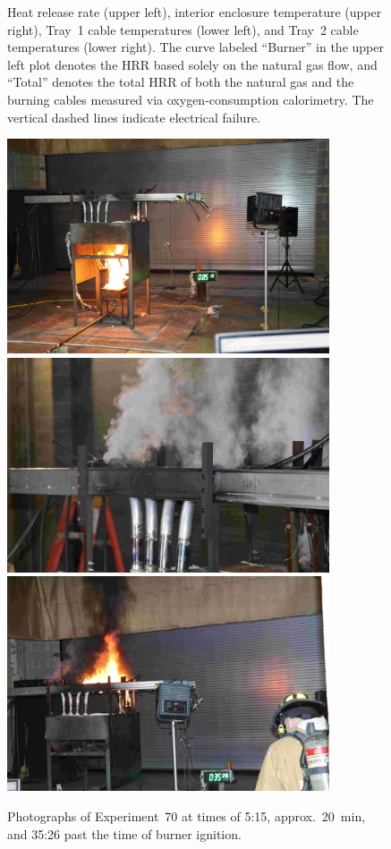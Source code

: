 \begin{figure}[H]
\caption[HRR and temperatures of Experiment 70]{Heat release rate (upper left), interior enclosure temperature (upper right), Tray~1 cable temperatures (lower left), and Tray~2 cable temperatures (lower right). The curve labeled ``Burner'' in the upper left plot denotes the HRR based solely on the natural gas flow, and ``Total'' denotes the total HRR of both the natural gas and the burning cables measured via oxygen-consumption calorimetry. The vertical dashed lines indicate electrical failure.}
\label{fig:Test_70}
\end{figure}

\begin{figure}[p]
\centering
\includegraphics[height=2.50in]{../FIGURES/Test_70_Photo_1} \\ \vspace{0.1in}
\includegraphics[height=2.50in]{../FIGURES/Test_70_Photo_2} \\ \vspace{0.1in}
\includegraphics[height=2.50in]{../FIGURES/Test_70_Photo_3}
\caption[Photographs of Experiment~70]{Photographs of Experiment~70 at times of 5:15, approx.~20~min, and 35:26 past the time of burner ignition.}
\label{fig:Test_70_photos}
\end{figure}



